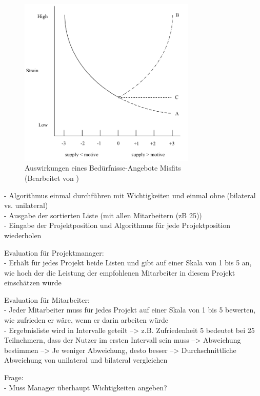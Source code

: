 \begin{figure}[h]
	\centering
	\includegraphics[width=0.75\textwidth]{gfx/ueberschuss_supply_motive.png}
	\caption{Auswirkungen eines Bedürfnisse-Angebote Misfits \cite[S. 23]{edwards:2008}\\(Bearbeitet von \myName)}
	\label{fig:methodik:abb2}
\end{figure}

- Algorithmus einmal durchführen mit Wichtigkeiten und einmal ohne (bilateral vs. unilateral)\\
- Ausgabe der sortierten Liste (mit allen Mitarbeitern (zB 25))\\
- Eingabe der Projektposition und Algorithmus für jede Projektposition wiederholen

Evaluation für Projektmanager:\\
- Erhält für jedes Projekt beide Listen und gibt auf einer Skala von 1 bis 5 an, wie hoch der die Leistung der empfohlenen Mitarbeiter in diesem Projekt einschätzen würde

Evaluation für Mitarbeiter:\\
- Jeder Mitarbeiter muss für jedes Projekt auf einer Skala von 1 bis 5 bewerten, wie zufrieden er wäre, wenn er darin arbeiten würde\\
- Ergebnisliste wird in Intervalle geteilt --> z.B. Zufriedenheit 5 bedeutet bei 25 Teilnehmern, dass der Nutzer im ersten Intervall sein muss --> Abweichung bestimmen --> Je weniger Abweichung, desto besser --> Durchschnittliche Abweichung von unilateral und bilateral vergleichen

Frage:\\
- Muss Manager überhaupt Wichtigkeiten angeben?
